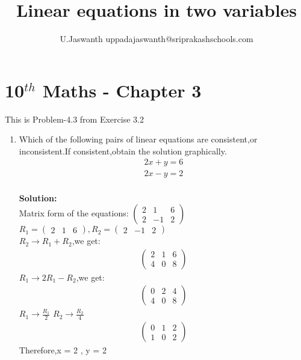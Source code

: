 \documentclass[12pt]{article}
\title{Linear equations in two variables}
\author{U.Jaswanth {uppadajaswanth@sriprakashschools.com}}
\newcommand{\myvec}[1]{\ensuremath{\begin{pmatrix}#1\end{pmatrix}}}
\newcommand{\solution}{\noindent \textbf{Solution: }}
\begin{document}
\maketitle
\section*{10$^{th}$ Maths - Chapter 3}
This is Problem-4.3 from Exercise 3.2
\begin{enumerate}
\item Which of the following pairs of linear equations are consistent,or inconsistent.If consistent,obtain the solution graphically.\\
\begin{align}
2x+y=6\\
2x-y=2\\
\end{align}

\solution \\
Matrix form of the equations:
$\myvec{2 & 1 & 6\\2 & -1 & 2}$\\
$R_1=\myvec{2 & 1 & 6},R_2=\myvec{2 & -1 & 2}$\\
$R_2\rightarrow R_1 + R_2$,we get:
\begin{align}
\myvec{2 & 1 & 6\\4 & 0 & 8}
\end{align}
$R_1\rightarrow 2R_1 - R_2$,we get:
\begin{align}
\myvec{0 & 2 & 4\\4 & 0 & 8}
\end{align}
$R_1\rightarrow \frac{R_1}{2}$
$R_2\rightarrow \frac{R_2}{4}$
\begin{align}
\myvec{0 & 1 & 2\\1 & 0 & 2}
\end{align}
Therefore,x = 2 , y = 2
\end{enumerate}
\end{document}
